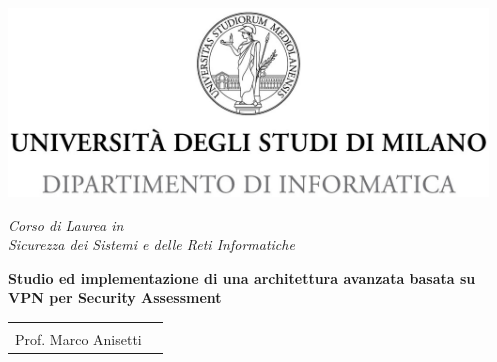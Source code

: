 \documentclass[12pt,fleqn,twoside,a4paper]{book}
\begin{document}

\begin{titlepage}
  \begin{center}
    \includegraphics[height=5.0cm]{img/minerva_2013_DI.jpg}

    \vspace*{.4cm}
    {\Large
      \emph{Corso di Laurea in\\[.3cm]
        Sicurezza dei Sistemi e delle Reti Informatiche}
    }
    \vfill
    \begin{LARGE}


      \textbf{Studio ed implementazione di una%
      \vspace{0.2cm}
        architettura avanzata basata su VPN%
        \vspace{0.2cm}
        per Security Assessment}
    \end{LARGE}

    \vfill
    \begin{minipage}{.99\linewidth}
      \begin{tabular}{l r}
        \begin{minipage}{.4\linewidth}
          \begin{flushleft}
            {\large
              RELATORE\\[.3cm]
              Prof. Marco Anisetti
            }


\end{flushleft}
\end{minipage}
\end{tabular}
\end{minipage}
\end{center}
\end{titlepage}
\end{document}
